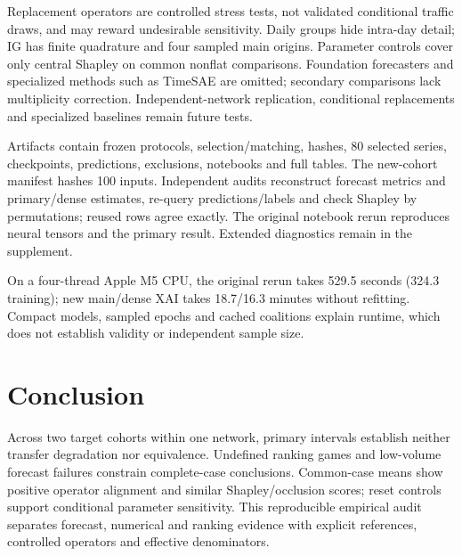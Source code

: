 \documentclass[conference]{IEEEtran}
\begin{document}
Replacement operators are controlled stress tests, not validated conditional traffic draws, and may reward undesirable sensitivity. Daily groups hide intra-day detail; IG has finite quadrature and four sampled main origins. Parameter controls cover only central Shapley on common nonflat comparisons. Foundation forecasters and specialized methods such as TimeSAE are omitted; secondary comparisons lack multiplicity correction. Independent-network replication, conditional replacements and specialized baselines remain future tests.

Artifacts contain frozen protocols, selection/matching, hashes, 80 selected series, checkpoints, predictions, exclusions, notebooks and full tables. The new-cohort manifest hashes 100 inputs. Independent audits reconstruct forecast metrics and primary/dense estimates, re-query predictions/labels and check Shapley by permutations; reused rows agree exactly. The original notebook rerun reproduces neural tensors and the primary result. Extended diagnostics remain in the supplement.

On a four-thread Apple M5 CPU, the original rerun takes 529.5 seconds (324.3 training); new main/dense XAI takes 18.7/16.3 minutes without refitting. Compact models, sampled epochs and cached coalitions explain runtime, which does not establish validity or independent sample size.

\section{Conclusion}
Across two target cohorts within one network, primary intervals establish neither transfer degradation nor equivalence. Undefined ranking games and low-volume forecast failures constrain complete-case conclusions. Common-case means show positive operator alignment and similar Shapley/occlusion scores; reset controls support conditional parameter sensitivity. This reproducible empirical audit separates forecast, numerical and ranking evidence with explicit references, controlled operators and effective denominators.

\FloatBarrier

\begingroup
{}

\endgroup
\end{document}
